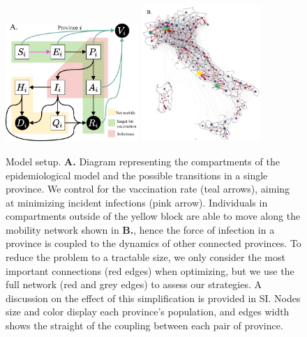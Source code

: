 \begin{figure}[!ht]
    \centering
    \includegraphics[width=0.45\textwidth]{fig_italy-ocp/figures/OCPItalydrawio2.pdf}
    \includegraphics[width=0.40\textwidth]{fig_italy-ocp/figures/map_nd.png}
    \caption[Optimal control model setup]{Model setup. \textbf{A.} Diagram representing the compartments of the epidemiological model and the possible transitions in a single province. We control for the vaccination rate (teal arrows), aiming at minimizing incident infections (pink arrow). Individuals in compartments outside of the yellow block are able to move along the mobility network shown in \textbf{B.}, hence the force of infection in a province is coupled to the dynamics of other connected provinces. To reduce the problem to a tractable size, we only consider the most important connections (red edges) when optimizing, but we use the full network (red and grey edges) to assess our strategies. A discussion on the effect of this simplification is provided in SI. Nodes size and color display each province's population, and edges width shows the straight of the coupling between each pair of province.
    }
    \label{fig:model_description}
\end{figure}

